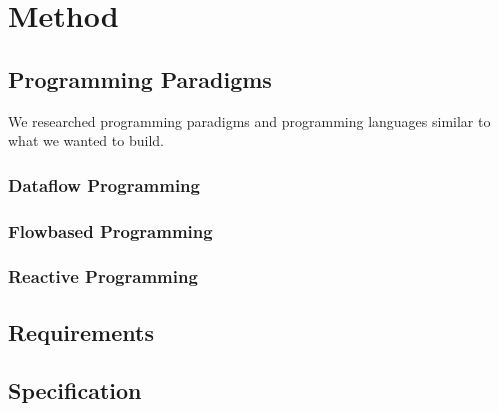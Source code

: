 \chapter{Method}

\section{Programming Paradigms}
We researched programming paradigms and programming languages similar
to what we wanted to build.


\subsection{Dataflow Programming}
\subsection{Flowbased Programming}
\subsection{Reactive Programming}

\section{Requirements}

\section{Specification}

